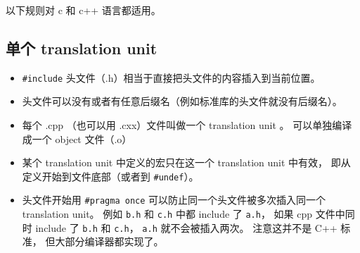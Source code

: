 
\begin{issues}
\issueDraft
\end{issues}


以下规则对 c 和 c++ 语言都适用。

\subsection{单个 translation unit}
\begin{itemize}
\item \verb|#include| 头文件（.h）相当于直接把头文件的内容插入到当前位置。
\item 头文件可以没有或者有任意后缀名（例如标准库的头文件就没有后缀名）。
\item 每个 .cpp （也可以用 .cxx）文件叫做一个 translation unit 。 可以单独编译成一个 object 文件（.o）
\item 某个 translation unit 中定义的宏只在这一个 translation unit 中有效， 即从定义开始到文件底部（或者到 \verb|#undef|）。
\item 头文件开始用 \verb|#pragma once| 可以防止同一个头文件被多次插入同一个 translation unit。 例如 \verb|b.h| 和 \verb|c.h| 中都 include 了 \verb|a.h|， 如果 cpp 文件中同时 include 了 \verb|b.h| 和 \verb|c.h|， \verb|a.h| 就不会被插入两次。 注意这并不是 C++ 标准， 但大部分编译器都实现了。
\end{itemize}

